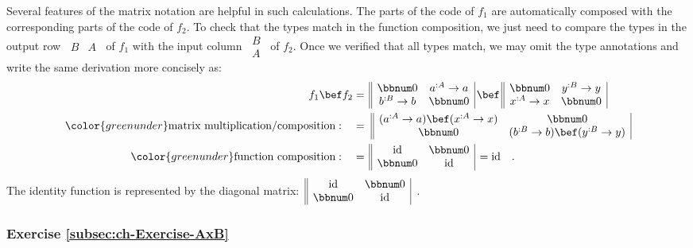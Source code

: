 Several features of the matrix notation are helpful in such calculations.
The parts of the code of $f_{1}$ are automatically composed with
the corresponding parts of the code of $f_{2}$. To check that the
types match in the function composition, we just need to compare the
types in the output row $\,\begin{array}{||cc|}
B & A\end{array}\,$ of $f_{1}$ with the input column $\,\begin{array}{|c||}
B\\
A
\end{array}\,$ of $f_{2}$. Once we verified that all types match, we may omit the
type annotations and write the same derivation more concisely as:
\begin{align*}
f_{1}\bef f_{2} & =\,\begin{array}{||cc|}
\bbnum 0 & a^{:A}\rightarrow a\\
b^{:B}\rightarrow b & \bbnum 0
\end{array}\,\bef\,\begin{array}{||cc|}
\bbnum 0 & y^{:B}\rightarrow y\\
x^{:A}\rightarrow x & \bbnum 0
\end{array}\\
{\color{greenunder}\text{matrix multiplication/composition}:}\quad & =\,\,\begin{array}{||cc|}
(a^{:A}\rightarrow a)\bef(x^{:A}\rightarrow x) & \bbnum 0\\
\bbnum 0 & (b^{:B}\rightarrow b)\bef(y^{:B}\rightarrow y)
\end{array}\\
{\color{greenunder}\text{function composition}:}\quad & =\,\begin{array}{||cc|}
\text{id} & \bbnum 0\\
\bbnum 0 & \text{id}
\end{array}\,=\text{id}\quad.
\end{align*}
The identity function is represented by the diagonal matrix: $\,\begin{array}{||cc|}
\text{id} & \bbnum 0\\
\bbnum 0 & \text{id}
\end{array}$~.

\subsubsection{Exercise \label{subsec:ch-Exercise-AxB}\ref{subsec:ch-Exercise-AxB}}

